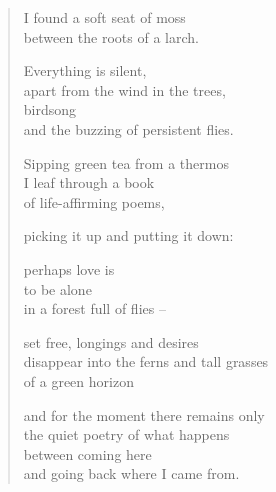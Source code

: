 \begin{verse}
I found a soft seat of moss\\
between the roots of a larch.

Everything is silent,\\
apart from the wind in the trees,\\
birdsong\\
and the buzzing of persistent flies.

Sipping green tea from a thermos\\
I leaf through a book\\
of life-affirming poems,

picking it up and putting it down:

perhaps love is\\
to be alone\\
in a forest full of flies --

set free, longings and desires\\
disappear into the ferns and tall grasses\\
of a green horizon

\clearpage

and for the moment there remains only\\
the quiet poetry of what happens\\
between coming here\\
and going back where I came from.

\end{verse}

